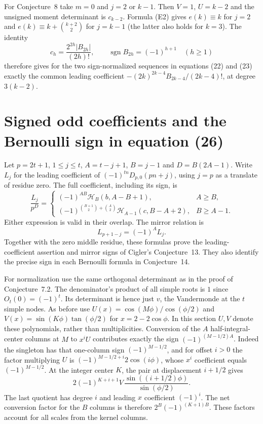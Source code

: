 \documentclass[11pt,a4paper]{article}
\begin{document}
For Conjecture~8 take $m=0$ and $j=2$ or $k-1$. Then $V=1$, $U=k-2$ and the unsigned moment determinant is $c_{k-2}$. Formula (E2) gives $e(k)\equiv k$ for $j=2$ and $e(k)\equiv k+\binom{k+2}{2}$ for $j=k-1$ (the latter also holds for $k=3$). The identity
\[
 c_h=\frac{2^{2h}|B_{2h}|}{(2h)!},\qquad
 \operatorname{sgn} B_{2h}=(-1)^{h+1}\quad(h\ge1)
\]
therefore gives for the two sign-normalized sequences in equations (22) and (23) exactly the common leading coefficient $-(2k)^{2k-4}B_{2k-4}/(2k-4)!$, at degree $3(k-2)$.

\section{Signed odd coefficients and the Bernoulli sign in equation (26)}
Let $p=2t+1$, $1\le j\le t$, $A=t-j+1$, $B=j-1$ and $D=B(2A-1)$. Write $L_j$ for the leading coefficient of $(-1)^{tn}D_{p,0}(pn+j)$, using $j=p$ as a translate of residue zero. The full coefficient, including its sign, is
\[
 \frac{L_j}{p^D}=
 \begin{cases}
 (-1)^{AB}\mathcal H_B(b,A-B+1),& A\ge B,\\[2pt]
 (-1)^{\binom{B+1}{2}+\binom A2}\mathcal H_{A-1}(c,B-A+2),& B\ge A-1 .
 \end{cases}
 \tag{O1}
\]
Either expression is valid in their overlap. The mirror relation is
\[
 L_{p+1-j}=(-1)^A L_j.\tag{O2}
\]
Together with the zero middle residue, these formulas prove the leading-coefficient assertion and mirror signs of Cigler's Conjecture~13. They also identify the precise sign in each Bernoulli formula in Conjecture~14.

For normalization use the same orthogonal determinant as in the proof of Conjecture~7.2. The denominator's product of all simple roots is $1$ since $O_t(0)=(-1)^t$. Its determinant is hence just $v$, the Vandermonde at the $t$ simple nodes. As before use $U(x)=\cos(M\phi)/\cos(\phi/2)$ and $V(x)=\sin(K\phi)\tan(\phi/2)$ for $x=2-2\cos\phi$. In this section $U,V$ denote these polynomials, rather than multiplicities. Conversion of the $A$ half-integral-center columns at $M$ to $x^iU$ contributes exactly the sign $(-1)^{(M-1/2)A}$. Indeed the singleton has that one-column sign $(-1)^{M-1/2}$, and for offset $i>0$ the factor multiplying $U$ is $(-1)^{M-1/2+i}2\cos(i\phi)$, whose $x^i$ coefficient equals $(-1)^{M-1/2}$. At the integer center $K$, the pair at displacement $i+1/2$ gives
\[
 2(-1)^{K+i+1}V\,\frac{\sin((i+1/2)\phi)}{\sin(\phi/2)} .
\]
The last quotient has degree $i$ and leading $x$ coefficient $(-1)^i$. The net conversion factor for the $B$ columns is therefore $2^B(-1)^{(K+1)B}$. These factors account for all scales from the kernel columns.
\end{document}
